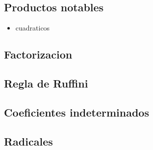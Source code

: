 
\subsection{Productos notables}\label{producto notable}

\begin{itemize}
\item cuadraticos
\end{itemize}

\subsection{Factorizacion}
\subsection{Regla de Ruffini}
\subsection{Coeficientes indeterminados}
\subsection{Radicales}

